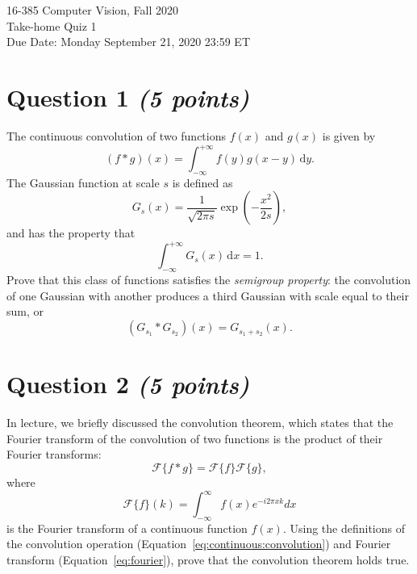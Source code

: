 \documentclass[12pt]{article}
\newcommand{\ud}{\,\mathrm{d}}
\begin{document}
\begin{centering}
	{\large 16-385 Computer Vision, Fall 2020\\}
	\vspace{2ex}
	{\LARGE Take-home Quiz 1\\}
	\vspace{2ex}
	{\large Due Date: Monday September 21, 2020 23:59 ET\\}
\end{centering}

\bigskip

\section*{Question 1 \emph{\small(5 points)}}

The continuous convolution of two functions
$f\left(x\right)$ and $g\left(x\right)$ is given by
\begin{equation}
	\left(f \ast g \right)\left(x\right) = \int_{-\infty}^{+\infty} f\left(y\right)
g\left(x - y\right) \ud y. \label{eq:continuous:convolution}
\end{equation}
The Gaussian function at scale $s$ is defined as
\begin{equation}
	G_s \left(x\right) = \frac{1}{\sqrt{2 \pi s}} \exp\left(-\frac{x^2}{2s}\right),
\label{eq:gaussian}
\end{equation}
and has the property that
\begin{equation}
	\int_{-\infty}^{+\infty} G_s\left(x\right) \ud x = 1. \label{eq:norm}
\end{equation}
Prove that this class of functions satisfies the \emph{semigroup property}: the
convolution of one Gaussian with another produces a third Gaussian with scale equal to
their sum, or
\begin{equation}
	\left(G_{s_1} \ast G_{s_2}\right) \left(x\right) = G_{s_1 + s_2} \left(x\right).
\label{eq:semi:group}
\end{equation}
  
\section*{Question 2 \emph{\small(5 points)}}

In lecture, we briefly discussed the convolution theorem, which states that the Fourier transform of the convolution of two functions is the product of their Fourier transforms:
\begin{equation}
\mathcal{F}\{f * g\} = \mathcal{F}\{f\}\mathcal{F}\{g\} ,
\end{equation}
where
\begin{equation}
\mathcal{F}\{f\}(k) = \int_{-\infty}^{\infty} f(x) e^{-i2\pi x k} dx
\label{eq:fourier}
\end{equation}
is the Fourier transform of a continuous function $f(x)$.  Using the definitions of the convolution operation (Equation~\eqref{eq:continuous:convolution}) and Fourier transform (Equation~\eqref{eq:fourier}), prove that the convolution theorem holds true.
\end{document}
